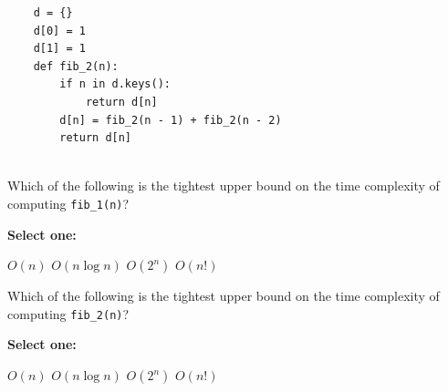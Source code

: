 \documentclass[11pt,addpoints,answers]{exam}
\numberwithin{equation}{section} %
\numberwithin{figure}{section} %
\numberwithin{table}{section} %
\begin{document}
\begin{questions}
\begin{lstlisting}
    d = {}
    d[0] = 1
    d[1] = 1
    def fib_2(n):
        if n in d.keys():
            return d[n]
        d[n] = fib_2(n - 1) + fib_2(n - 2)
        return d[n]
        
    \end{lstlisting}
    
    \question[2] Which of the following is the tightest upper bound on the time complexity of computing \lstinline{fib_1(n)}? 

    \textbf{Select one:}
    \begin{checkboxes}
        \choice $O(n)$
        \choice $O(n \log n)$
        \choice $O(2^n)$
        \choice $O(n!)$
    \end{checkboxes}
    \clearpage
    \question[2] Which of the following is the tightest upper bound on the time complexity of computing \lstinline{fib_2(n)}? 

    \textbf{Select one:}
    \begin{checkboxes}
        \choice $O(n)$
        \choice $O(n \log n)$
        \choice $O(2^n)$
        \choice $O(n!)$
    \end{checkboxes}

    \clearpage
    \end{questions}

\end{document}
